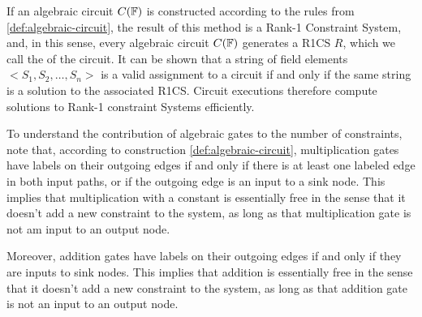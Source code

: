 If an algebraic circuit $C(\mathbb{F})$ is constructed according to the rules from \ref{def:algebraic-circuit}, the result of this method is a Rank-1 Constraint System, and, in this sense, every algebraic circuit $C(\mathbb{F})$ generates a R1CS $R$, which we call the  of the circuit. It can be shown that a string of field elements $<S_1,S_2,\ldots, S_n>$ is a valid assignment to a circuit if and only if the same string is a solution to the associated R1CS. Circuit executions therefore compute solutions to Rank-1 constraint Systems efficiently. 

To understand the contribution of algebraic gates to the number of constraints, note that,
according to construction \ref{def:algebraic-circuit}, multiplication gates have labels on their outgoing edges if and only if there is at least one labeled edge in both input paths, or if the outgoing edge is an input to a sink node. This implies that multiplication with a constant is essentially free in the sense that it doesn't add a new constraint to the system, as long as that multiplication gate is not am input to an output node. 

Moreover, addition gates have labels on their outgoing edges if and only if they are inputs to sink nodes. This implies that addition is essentially free in the sense that it doesn't add a new constraint to the system, as long as that addition gate is not an input to an output node. 

